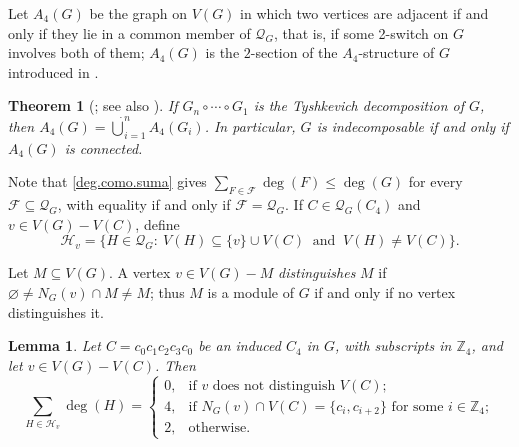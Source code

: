 \documentclass[11pt]{article}
\newtheorem{theorem}{Theorem}[section]
\newtheorem{lemma}[lemma]{Lemma}
\begin{document}
Let $A_4(G)$ be the graph on $V(G)$ in which two vertices are adjacent if
and only if they lie in a common member of $\mathcal{Q}_G$, that is, if some
2-switch on $G$ involves both of them; $A_4(G)$ is the $2$-section of the
$A_4$-structure of $G$ introduced in \cite{barrus.west.A4}.

\begin{theorem}[\cite{barrus.west.A4}; see also \cite{pastine2025simple}]
	\label{indecomp.characterization}
	If $G_n\circ\cdots\circ G_1$ is the Tyshkevich decomposition of $G$,
	then $A_4(G)=\dot{\bigcup}_{i=1}^{n}A_4(G_i)$. In particular, $G$ is
	indecomposable if and only if $A_4(G)$ is connected.
\end{theorem}

Note that \eqref{deg.como.suma} gives
$\sum_{F\in\mathcal{F}}\deg(F)\leq\deg(G)$ for every
$\mathcal{F}\subseteq\mathcal{Q}_G$, with equality if and only if
$\mathcal{F}=\mathcal{Q}_G$. If $C\in\mathcal{Q}_G(C_4)$ and $v\in V(G)-V(C)$, define
\[
\mathcal{H}_v=\bigl\{H\in \mathcal{Q}_G:\ V(H)\subseteq\{v\}\cup V(C)
\ \text{ and }\ V(H)\neq V(C)\bigr\}.
\]

Let $M\subseteq V(G)$. A vertex $v\in V(G)-M$ \emph{distinguishes} $M$ if $\varnothing\neq N_G(v)\cap M\neq M$; thus $M$ is a module of $G$ if and only if no vertex distinguishes it.

\begin{lemma}
	\label{conteo.local.C4}
	Let $C=c_0c_1c_2c_3c_0$ be an induced $C_4$ in $G$, with subscripts
	in $\mathbb{Z}_4$, and let $v\in V(G)-V(C)$. Then
	\[
	\sum_{H\in\mathcal{H}_v}\deg(H)=
	\begin{cases}
		0, & \text{if } v \text{ does not distinguish } V(C);\\[2pt]
		4, & \text{if } N_G(v)\cap V(C)=\{c_i,c_{i+2}\}
		\text{ for some } i\in\mathbb{Z}_4;\\[2pt]
		2, & \text{otherwise.}
	\end{cases}
	\]
\end{lemma}
\end{document}
